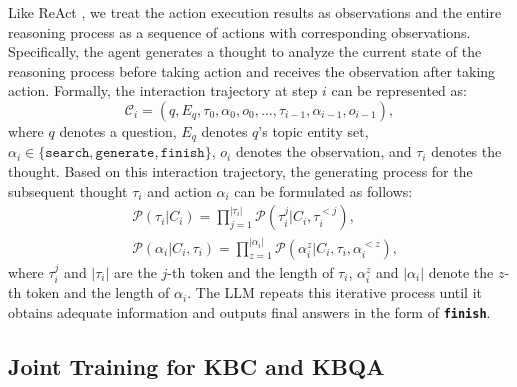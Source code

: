 \documentclass[11pt]{article}
\begin{document}
 Like ReAct \cite{DBLP:conf/iclr/YaoZYDSN023}, we treat the action execution results as observations and the entire reasoning process as a sequence of actions with corresponding observations. Specifically, the agent generates a thought to analyze the current state of the reasoning process before taking action and receives the observation after taking action.
Formally, the interaction trajectory at step $i$ can be represented as:
\begin{equation}
    \mathcal{C}_i=(q,E_q,\tau_0,\alpha_0,o_0,\dots,\tau_{i-1},\alpha_{i-1},o_{i-1}),
\end{equation}
where $q$ denotes a question, $E_q$ denotes $q$'s topic entity set, $\alpha_i \in \{\texttt{search},\texttt{generate},\texttt{finish}\}$, $o_i$ denotes the observation, and $\tau_i$ denotes the thought.
Based on this interaction trajectory, the generating process for the subsequent thought $\tau_i$ and action $\alpha_i$ can be formulated as follows:
\begin{align}
    & \mathcal{P}(\tau_i|C_i)=\prod_{j=1}^{|\tau_i|}{\mathcal{P}(\tau_i^j|C_i,\tau_{i}^{<j})},\ \ \\
    & \mathcal{P}(\alpha_i|C_i,\tau_i)=\prod_{z=1}^{|\alpha_i|}{\mathcal{P}(\alpha_i^z|C_i,\tau_{i},\alpha_{i}^{<z})}, \label{equal:4}
\end{align}
where $\tau_i^j$ and $|\tau_i|$ are the $j$-th token and the length of $\tau_i$, $\alpha_i^z$ and $|\alpha_i|$ denote the $z$-th token and the length of $\alpha_i$. The LLM repeats this iterative process until it obtains adequate information and outputs final answers in the form of \textbf{\texttt{finish}}.

\subsection{Joint Training for KBC and KBQA} \label{sec:3.3}
\end{document}

